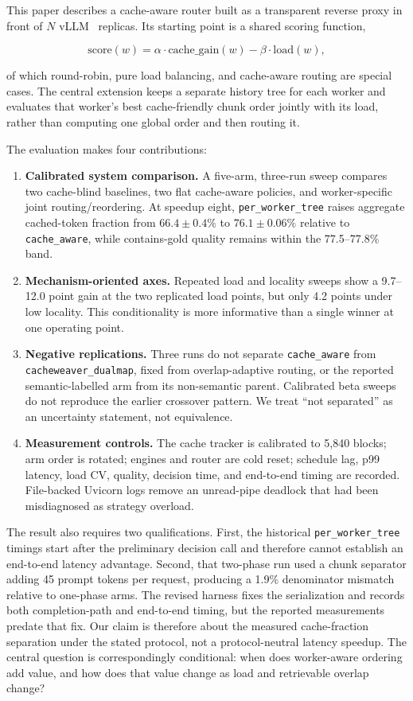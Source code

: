 \documentclass[conference]{IEEEtran}
\begin{document}
This paper describes a cache-aware router built as a transparent
reverse proxy in front of $N$ vLLM~\cite{kwon2023vllm} replicas. Its
starting point is a shared scoring function,

\[
\text{score}(w) = \alpha \cdot \text{cache\_gain}(w) - \beta \cdot \text{load}(w),
\]

of which round-robin, pure load balancing, and cache-aware routing are
special cases. The central extension keeps a separate history tree for
each worker and evaluates that worker's best cache-friendly chunk order
jointly with its load, rather than computing one global order and then
routing it.

The evaluation makes four contributions:

\begin{enumerate}
  \item \textbf{Calibrated system comparison.} A five-arm, three-run
  sweep compares two cache-blind baselines, two flat cache-aware
  policies, and worker-specific joint routing/reordering. At speedup
  eight, \texttt{per\_worker\_tree} raises aggregate cached-token
  fraction from $66.4\pm0.4\%$ to $76.1\pm0.06\%$ relative to
  \texttt{cache\_aware}, while contains-gold quality remains within the
  77.5--77.8\% band.
  \item \textbf{Mechanism-oriented axes.} Repeated load and locality
  sweeps show a 9.7--12.0 point gain at the two replicated load points,
  but only 4.2 points under low locality. This conditionality is more
  informative than a single winner at one operating point.
  \item \textbf{Negative replications.} Three runs do not separate
  \texttt{cache\_aware} from \texttt{cacheweaver\_dualmap}, fixed from
  overlap-adaptive routing, or the reported semantic-labelled arm from
  its non-semantic parent. Calibrated beta sweeps do not reproduce the
  earlier crossover pattern. We treat ``not separated'' as an
  uncertainty statement, not equivalence.
  \item \textbf{Measurement controls.} The cache tracker is calibrated
  to 5{,}840 blocks; arm order is rotated; engines and router are cold
  reset; schedule lag, p99 latency, load CV, quality, decision time, and
  end-to-end timing are recorded. File-backed Uvicorn logs remove an
  unread-pipe deadlock that had been misdiagnosed as strategy overload.
\end{enumerate}

The result also requires two qualifications. First, the historical
\texttt{per\_worker\_tree} timings start after the preliminary decision
call and therefore cannot establish an end-to-end latency advantage.
Second, that two-phase run used a chunk separator adding 45 prompt
tokens per request, producing a 1.9\% denominator mismatch relative to
one-phase arms. The revised harness fixes the serialization and records
both completion-path and end-to-end timing, but the reported measurements
predate that fix. Our claim is therefore about the measured cache-fraction
separation under the stated protocol, not a protocol-neutral latency
speedup. The central question is correspondingly conditional: when does
worker-aware ordering add value, and how does that value change as load
and retrievable overlap change?
\end{document}

